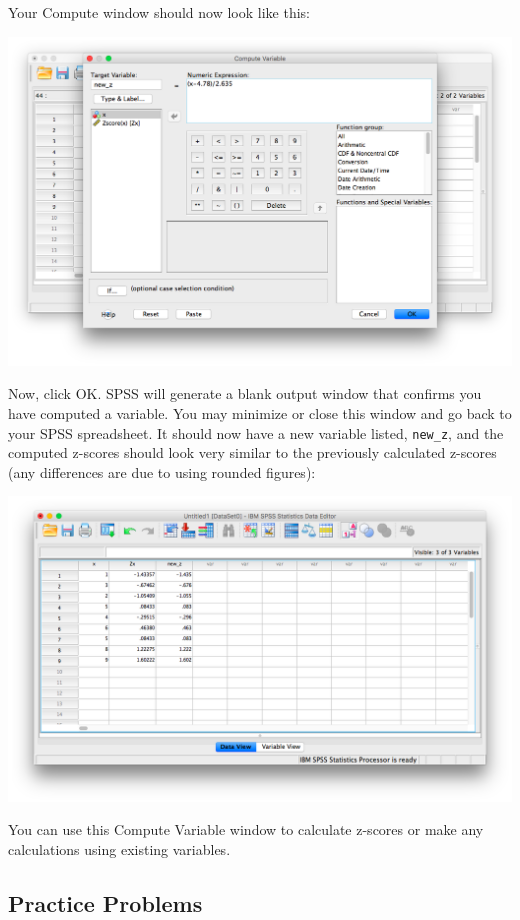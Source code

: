 \documentclass[
]{book}
\begin{document}
Your Compute window should now look like this:

\includegraphics{img/4.4.18.png}

Now, click {OK}. SPSS will generate a blank output window that confirms you have computed a variable. You may minimize or close this window and go back to your SPSS spreadsheet. It should now have a new variable listed, \texttt{new\_z}, and the computed z-scores should look very similar to the previously calculated z-scores (any differences are due to using rounded figures):

\includegraphics{img/4.4.19.png}

You can use this Compute Variable window to calculate z-scores or make any calculations using existing variables.

\hypertarget{practice-problems-3}{%
\subsection{Practice Problems}\label{practice-problems-3}}
\end{document}
